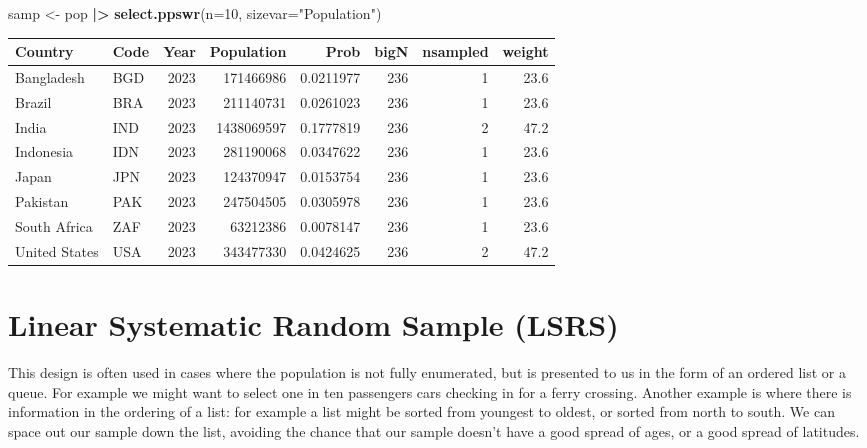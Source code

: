 \documentclass[
]{book}
\newenvironment{Shaded}{\begin{snugshade}}{\end{snugshade}}
\newcommand{\AttributeTok}[1]{\textcolor[rgb]{0.13,0.29,0.53}{#1}}
\newcommand{\DecValTok}[1]{\textcolor[rgb]{0.00,0.00,0.81}{#1}}
\newcommand{\FunctionTok}[1]{\textcolor[rgb]{0.13,0.29,0.53}{\textbf{#1}}}
\newcommand{\NormalTok}[1]{#1}
\newcommand{\OtherTok}[1]{\textcolor[rgb]{0.56,0.35,0.01}{#1}}
\newcommand{\SpecialCharTok}[1]{\textcolor[rgb]{0.81,0.36,0.00}{\textbf{#1}}}
\newcommand{\StringTok}[1]{\textcolor[rgb]{0.31,0.60,0.02}{#1}}
\begin{document}
\begin{Shaded}
\begin{Highlighting}[]
\NormalTok{samp }\OtherTok{\textless{}{-}}\NormalTok{ pop }\SpecialCharTok{|\textgreater{}} \FunctionTok{select.ppswr}\NormalTok{(}\AttributeTok{n=}\DecValTok{10}\NormalTok{, }\AttributeTok{sizevar=}\StringTok{"Population"}\NormalTok{)}
\end{Highlighting}
\end{Shaded}

\begin{table}
\centering
\begin{tabular}[t]{l|l|r|r|r|r|r|r}
\hline
Country & Code & Year & Population & Prob & bigN & nsampled & weight\\
\hline
Bangladesh & BGD & 2023 & 171466986 & 0.0211977 & 236 & 1 & 23.6\\
\hline
Brazil & BRA & 2023 & 211140731 & 0.0261023 & 236 & 1 & 23.6\\
\hline
India & IND & 2023 & 1438069597 & 0.1777819 & 236 & 2 & 47.2\\
\hline
Indonesia & IDN & 2023 & 281190068 & 0.0347622 & 236 & 1 & 23.6\\
\hline
Japan & JPN & 2023 & 124370947 & 0.0153754 & 236 & 1 & 23.6\\
\hline
Pakistan & PAK & 2023 & 247504505 & 0.0305978 & 236 & 1 & 23.6\\
\hline
South Africa & ZAF & 2023 & 63212386 & 0.0078147 & 236 & 1 & 23.6\\
\hline
United States & USA & 2023 & 343477330 & 0.0424625 & 236 & 2 & 47.2\\
\hline
\end{tabular}
\end{table}

\section{Linear Systematic Random Sample (LSRS)}\label{linear-systematic-random-sample-lsrs}

This design is often used in cases where the population is not fully enumerated, but is
presented to us in the form of an ordered list or a queue. For example we might want to select one in ten
passengers cars checking in for a ferry crossing. Another example is where there is information
in the ordering of a list: for example a list might be sorted from youngest to oldest, or
sorted from north to south. We can space out our sample down the list, avoiding the chance
that our sample doesn't have a good spread of ages, or a good spread of latitudes.
\end{document}
